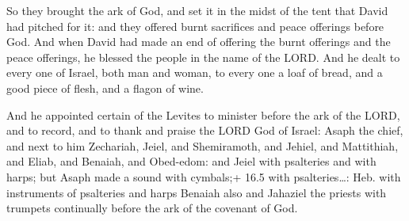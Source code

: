  So they brought the ark of God, and set it in the midst of
the tent that David had pitched for it: and they offered burnt
sacrifices and peace offerings before God.  And when David
had made an end of offering the burnt offerings and the peace offerings,
he blessed the people in the name of the LORD.  And he dealt
to every one of Israel, both man and woman, to every one a loaf of
bread, and a good piece of flesh, and a flagon of wine.

 And he appointed certain of the Levites to minister
before the ark of the LORD, and to record, and to thank and praise the
LORD God of Israel:  Asaph the chief, and next to him
Zechariah, Jeiel, and Shemiramoth, and Jehiel, and Mattithiah, and
Eliab, and Benaiah, and Obed-edom: and Jeiel with psalteries and with
harps; but Asaph made a sound with cymbals;+ 16.5 with psalteries\ldots:
Heb. with instruments of psalteries and harps  Benaiah also
and Jahaziel the priests with trumpets continually before the ark of the
covenant of God.

